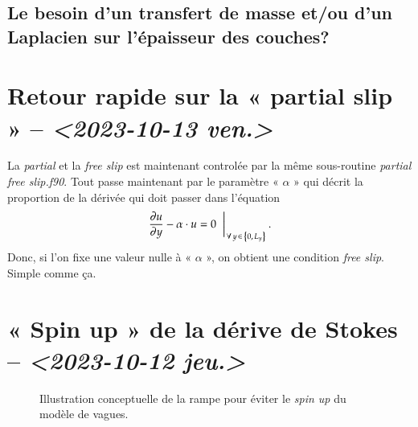 \documentclass[10pt]{article}
\numberwithin{equation}{section}
\newcommand{\pt}{\hspace{1pt}} %
\begin{document}
\subsection{Le besoin d'un transfert de masse et/ou d'un Laplacien sur l'épaisseur des couches?}
\label{sec:orgb237b46}

\section{Retour rapide sur la « partial slip » -- \textit{<2023-10-13 ven.>}}
\label{sec:orga65c65c}
La \emph{partial} et la \emph{free slip} est maintenant controlée par la même sous-routine \emph{partial free slip.f90}.
Tout passe maintenant par le paramètre « \(\alpha\) » qui décrit la proportion de la dérivée qui doit passer dans l'équation
\begin{equation}
   \eval{\pdv{u}{y} - \alpha \cdot u = 0\hspace{0.2cm}}_{\pt\forall\pt y\pt \in\pt \qty{0,\pt L_y}}.
\end{equation}
Donc, si l'on fixe une valeur nulle à « \(\alpha\) », on obtient une condition \emph{free slip}.
Simple comme ça. 



\section{« Spin up » de la dérive de Stokes -- \textit{<2023-10-12 jeu.>}}
\label{sec:org8978b30}

\begin{figure}
\vspace{-\baselineskip}
\begin{center}
\end{center}
\caption{\label{org8e918fa}Illustration conceptuelle de la rampe pour éviter le \emph{spin up} du modèle de vagues.}
\end{figure}
\end{document}
